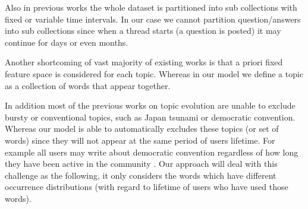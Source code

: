 Also in previous works the whole dataset is partitioned into sub collections with fixed or variable time intervals. In our case we cannot partition question/answers into sub collections since when a thread starts (a question is posted) it may continue for days or even months.  

Another shortcoming of vast majority of existing works is that a  priori fixed feature space is considered for each topic. Whereas in our model we define a topic as a collection of words that appear together. 

In addition most of the previous works on topic evolution are unable to exclude  bursty or conventional topics, such as Japan tsunami or democratic convention. Whereas our model is able to automatically excludes these topics (or set of words) since they will not appear at the same period of users lifetime. For example all users may write about democratic convention regardless of how long they have been active in the community .  Our approach will deal with this challenge as the following, it only considers the words which have different occurrence distributions (with regard to lifetime of users who have used those words).
\fi 


